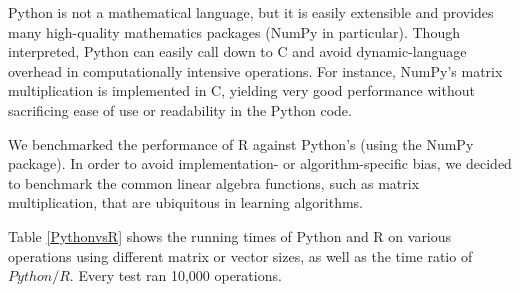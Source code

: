 \documentclass[%
  final,
  notitlepage,
  narroweqnarray,
  inline,
]{ieee}
\begin{document}
Python is not a mathematical language, but it is easily extensible and provides
many high-quality mathematics packages (NumPy in particular). Though
interpreted, Python can easily call down to C and avoid dynamic-language
overhead in computationally intensive operations. For instance, NumPy's matrix
multiplication is implemented in C, yielding very good performance
without sacrificing ease of use or readability in the Python code.

We benchmarked the performance of R against Python's (using the NumPy package).
In order to avoid implementation- or algorithm-specific bias, we decided to
benchmark the common linear algebra functions, such as matrix multiplication,
that are ubiquitous in learning algorithms.

Table \ref{PythonvsR} shows the running times of Python and R on various
operations using different matrix or vector sizes, as well as the time ratio of
$Python / R$. Every test ran 10,000 operations.
\end{document}
